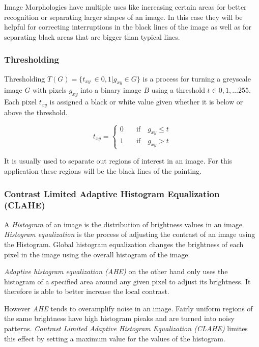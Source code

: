\documentclass[serif,article,noparskip]{agse-thesis}
\begin{document}
Image Morphologies have multiple uses like increasing certain areas for better
recognition or separating larger shapes of an image. In this case they will be
helpful for correcting interruptions in the black lines of the image as well as
for separating black areas that are bigger than typical lines.

\subsubsection{Thresholding}

Thresholding $T(G) = \{t_{xy}\ \in {0,1} | g_{xy} \in G\}$ is a process for turning a greyscale image $G$
with pixels $g_{xy}$ into a binary image $B$ using a threshold $t \in
0,1,\dots255$. Each pixel $t_{xy}$ is assigned a black or white value given
whether it is below or above the threshold.

\begin{equation}
  t_{xy} =
  \begin{cases}
    0 & \quad  \text{if}  \quad g_{xy} \leq t\\
    1  & \quad \text{if}  \quad g_{xy} > t
  \end{cases}
\end{equation}

It is usually used to separate out regions of interest in an image. For this
application these regions will be the black lines of the painting.

\subsubsection{Contrast Limited Adaptive Histogram
Equalization (CLAHE)}

A \textit{Histogram} of an image is the distribution of brightness values in an
image. \textit{Histogram equalization} is the process of adjusting the contrast
of an image using the Histogram. Global histogram equalization changes the
brightness of each pixel in the image using the overall histogram of the image.
\cite{ShapiroLindaG2001Cv}

\textit{Adaptive histogram equalization (AHE)} on the other hand only uses the
histogram of a specified area around any given pixel to adjust its brightness. It
therefore is able to better increase the local contrast.

However \textit{AHE} tends to overamplify noise in an image. Fairly uniform
regions of the same brightness have high histogram pieaks and are turned into
noisy patterns.  \textit{Contrast Limited Adaptive Histogram Equalization
(CLAHE)} limites this effect by setting a maximum value for the values of the
histogram. \cite{Pizer1987}
\end{document}
